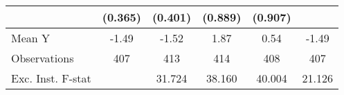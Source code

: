 {\begin{tabular}{l*{5}{c}}
            &     (0.365)         &     (0.401)         &     (0.889)         &     (0.907)         &                     \\
\midrule
Mean Y      &       -1.49         &       -1.52         &        1.87         &        0.54         &       -1.49         \\
Observations&         407         &         413         &         414         &         408         &         407         \\
Exc. Inst. F-stat&                     &      31.724         &      38.160         &      40.004         &      21.126         \\
\bottomrule
\end{tabular}
}
